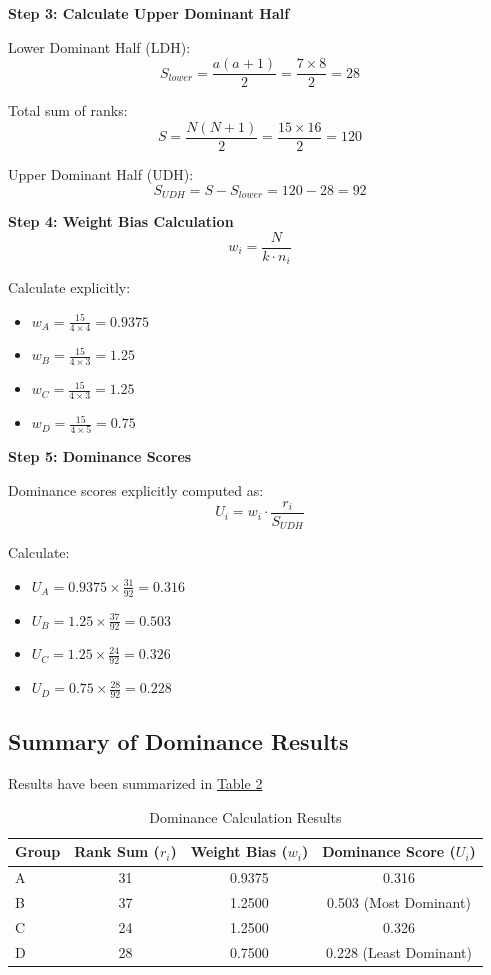 \documentclass[man,floatsintext]{apa7}
\begin{document}
\textbf{Step 3: Calculate Upper Dominant Half}

Lower Dominant Half (LDH):
\begin{equation}
S_{lower} = \frac{a(a+1)}{2} = \frac{7 \times 8}{2} = 28
\end{equation}

Total sum of ranks:
\begin{equation}
S = \frac{N(N+1)}{2} = \frac{15 \times 16}{2} = 120
\end{equation}

Upper Dominant Half (UDH):
\begin{equation}
S_{UDH} = S - S_{lower} = 120 - 28 = 92
\end{equation}

\textbf{Step 4: Weight Bias Calculation}
\begin{equation}
w_i = \frac{N}{k \cdot n_i}
\end{equation}

Calculate explicitly:
\begin{itemize}
\item $w_A = \frac{15}{4 \times 4} = 0.9375$
\item $w_B = \frac{15}{4 \times 3} = 1.25$
\item $w_C = \frac{15}{4 \times 3} = 1.25$
\item $w_D = \frac{15}{4 \times 5} = 0.75$
\end{itemize}

\textbf{Step 5: Dominance Scores}

Dominance scores explicitly computed as:
\begin{equation}
U_i = w_i \cdot \frac{r_i}{S_{UDH}}
\end{equation}

Calculate:
\begin{itemize}
\item $U_A = 0.9375 \times \frac{31}{92} = 0.316$
\item $U_B = 1.25 \times \frac{37}{92} = 0.503$
\item $U_C = 1.25 \times \frac{24}{92} = 0.326$
\item $U_D = 0.75 \times \frac{28}{92} = 0.228$
\end{itemize}

\subsection{Summary of Dominance Results}
Results have been summarized in \hyperref[dominance-result]{Table 2}
\begin{table}[htb!]
\centering
\caption{Dominance Calculation Results}
\begin{tabular}{lccc}
\toprule
Group & Rank Sum ($r_i$) & Weight Bias ($w_i$) & Dominance Score ($U_i$) \\
\midrule
A & 31 & 0.9375 & 0.316 \\
B & 37 & 1.2500 & 0.503 (Most Dominant) \\
C & 24 & 1.2500 & 0.326 \\
D & 28 & 0.7500 & 0.228 (Least Dominant) \\
\bottomrule
\end{tabular}
\label{dominance-result}
\end{table}
\end{document}
